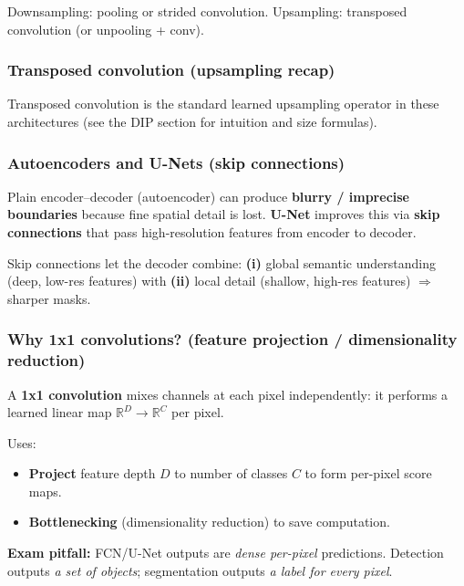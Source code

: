 \documentclass[11pt,a4paper]{article}
\newcommand{\R}{\mathbb{R}}
\begin{document}
Downsampling: pooling or strided convolution.  
Upsampling: transposed convolution (or unpooling + conv).

\subsubsection{Transposed convolution (upsampling recap)}
\begin{notebox}
Transposed convolution is the standard learned upsampling operator in these architectures
(see the DIP section for intuition and size formulas).
\end{notebox}

\subsubsection{Autoencoders and U-Nets (skip connections)}
\begin{defbox}
Plain encoder--decoder (autoencoder) can produce \textbf{blurry / imprecise boundaries} because fine spatial detail is lost.
\textbf{U-Net} improves this via \textbf{skip connections} that pass high-resolution features from encoder to decoder.
\end{defbox}

\begin{intbox}
Skip connections let the decoder combine:
\textbf{(i)} global semantic understanding (deep, low-res features) with
\textbf{(ii)} local detail (shallow, high-res features) $\Rightarrow$ sharper masks.
\end{intbox}

\subsubsection{Why 1x1 convolutions? (feature projection / dimensionality reduction)}
\begin{defbox}
A \textbf{1x1 convolution} mixes channels at each pixel independently:
it performs a learned linear map $\R^{D}\to\R^{C}$ per pixel.
\end{defbox}

Uses:
\begin{itemize}
  \item \textbf{Project} feature depth $D$ to number of classes $C$ to form per-pixel score maps.
  \item \textbf{Bottlenecking} (dimensionality reduction) to save computation.
\end{itemize}

\begin{qbox}
\textbf{Exam pitfall:} FCN/U-Net outputs are \emph{dense per-pixel} predictions.
Detection outputs \emph{a set of objects}; segmentation outputs \emph{a label for every pixel}.
\end{qbox}
\end{document}
